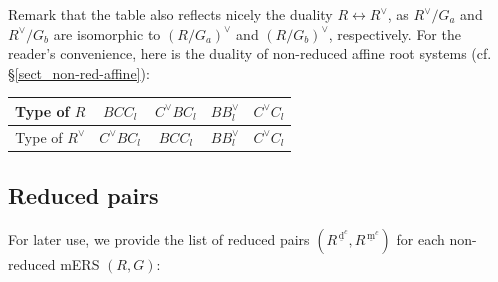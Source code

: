 \documentclass[11pt]{amsart}
\newcommand{\dc}{\,\underline{\mathrm{d}}^c}
\newcommand{\mc}{\, \underline{\mathrm{m}}^c}
\begin{document}
Remark that the table also reflects nicely the duality $R \leftrightarrow R^\vee$, as $R^\vee/G_a$ and $R^\vee /G_b$ are isomorphic to $(R/G_a)^\vee$ and $(R/G_b)^\vee$, respectively.  For the reader's convenience, here is the duality of non-reduced affine root systems (cf. \S \ref{sect_non-red-affine}): \\

\begin{center}
\begin{tabular}{|c||c|c|c|c|} \hline
Type of $R$ & $BCC_l$ & $C^\vee BC_l$ & $BB_l^\vee$ & $C^\vee C_l$ \\ \hline
Type of $R^\vee$ & $C^\vee BC_l$ & $BCC_l$ & $BB_l^\vee$ & $C^\vee C_l$  \\ \hline
\end{tabular}
\end{center}

\vskip 0.1in
\subsection{Reduced pairs}\label{sect_red-pair}

For later use, we provide the list of reduced pairs $(R^{\dc}, R^{\mc})$ for each 
non-reduced mERS $(R,G)$:

\end{document}
